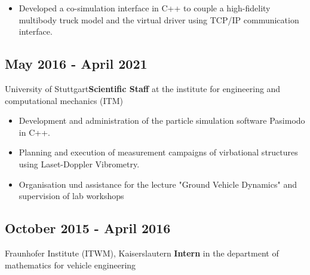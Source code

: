 \documentclass{mycv}
\begin{document}
\begin{paracol}{2}
{\begin{itemize}
            \item Developed a co-simulation interface in C++ to couple a high-fidelity
                multibody truck model and the virtual driver using
                TCP/IP communication interface.

          \end{itemize}

    \subsection{May 2016 - April 2021}{University of Stuttgart}{{\bfseries Scientific Staff} at the institute for engineering and
        computational \quad\quad mechanics (ITM)}
           \begin{itemize}
               \item Development and administration of the particle simulation
                   software Pasimodo in C++.
               \item Planning and execution of measurement campaigns of
                   virbational structures using Laset-Doppler Vibrometry.

               \item Organisation und assistance for the lecture "Ground
                   Vehicle Dynamics" and supervision of lab workshops

           \end{itemize}

    \subsection{October 2015 - April 2016}{Fraunhofer Institute (ITWM), Kaiserslautern}
        {{\bfseries Intern} in the department of mathematics for vehicle engineering}\\
}
\end{paracol}
\end{document}
